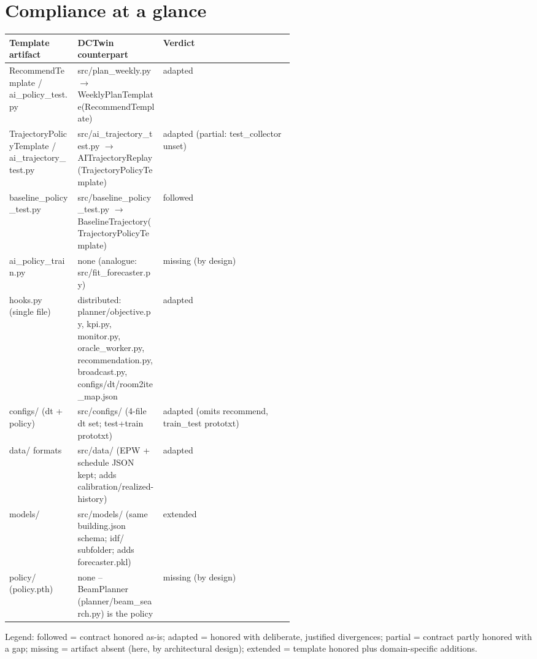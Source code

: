 \documentclass[10pt]{article}
\begin{document}
\section*{Compliance at a glance}
\vspace{1pt}\begin{tabularx}{\linewidth}{@{}p{0.24\linewidth} p{0.30\linewidth} X@{}}
\toprule
\textbf{Template artifact} & \textbf{DCTwin counterpart} & \textbf{Verdict} \\
\midrule
RecommendTemplate /\allowbreak{} ai\_\allowbreak{}policy\_\allowbreak{}test.py & src/\allowbreak{}plan\_\allowbreak{}weekly.py $\rightarrow$ WeeklyPlanTemplate(RecommendTemplate) & adapted \\
TrajectoryPolicyTemplate /\allowbreak{} ai\_\allowbreak{}trajectory\_\allowbreak{}test.py & src/\allowbreak{}ai\_\allowbreak{}trajectory\_\allowbreak{}test.py $\rightarrow$ AITrajectoryReplay(TrajectoryPolicyTemplate) & adapted (partial: test\_\allowbreak{}collector unset) \\
baseline\_\allowbreak{}policy\_\allowbreak{}test.py & src/\allowbreak{}baseline\_\allowbreak{}policy\_\allowbreak{}test.py $\rightarrow$ BaselineTrajectory(TrajectoryPolicyTemplate) & followed \\
ai\_\allowbreak{}policy\_\allowbreak{}train.py & none (analogue: src/\allowbreak{}fit\_\allowbreak{}forecaster.py) & missing (by design) \\
hooks.py (single file) & distributed: planner/\allowbreak{}objective.py, kpi.py, monitor.py, oracle\_\allowbreak{}worker.py, recommendation.py, broadcast.py, configs/\allowbreak{}dt/\allowbreak{}room2ite\_\allowbreak{}map.json & adapted \\
configs/\allowbreak{} (dt + policy) & src/\allowbreak{}configs/\allowbreak{} (4-file dt set; test+train prototxt) & adapted (omits recommend, train\_\allowbreak{}test prototxt) \\
data/\allowbreak{} formats & src/\allowbreak{}data/\allowbreak{} (EPW + schedule JSON kept; adds calibration/\allowbreak{}realized-history) & adapted \\
models/\allowbreak{} & src/\allowbreak{}models/\allowbreak{} (same building.json schema; idf/\allowbreak{} subfolder; adds forecaster.pkl) & extended \\
policy/\allowbreak{} (policy.pth) & none -- BeamPlanner (planner/\allowbreak{}beam\_\allowbreak{}search.py) is the policy & missing (by design) \\
\bottomrule
\end{tabularx}\vspace{2pt}
Legend: followed = contract honored as-is; adapted = honored with deliberate, justified divergences; partial = contract partly honored with a gap; missing = artifact absent (here, by architectural design); extended = template honored plus domain-specific additions.
\end{document}
